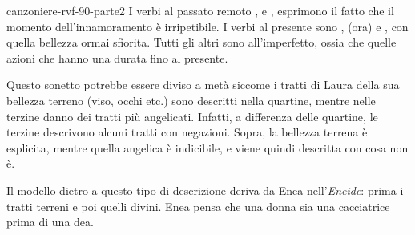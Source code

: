 \documentclass[preview]{standalone}
\begin{document}
\begin{snippet}{canzoniere-rvf-90-parte2}
    I verbi al passato remoto ,  e ,
    esprimono il fatto che il momento dell'innamoramento è irripetibile.
    I verbi al presente sono ,  (ora) e ,
    con quella bellezza ormai sfiorita.
    Tutti gli altri sono all'imperfetto, ossia che quelle azioni che hanno una durata fino al presente.

    Questo sonetto potrebbe essere diviso a metà siccome i tratti di Laura
    della sua bellezza terreno (viso, occhi etc.) sono descritti nella quartine,
    mentre nelle terzine danno dei tratti più angelicati.
    Infatti, a differenza delle quartine, le terzine descrivono alcuni tratti con
    negazioni. Sopra, la bellezza terrena è esplicita, mentre quella angelica è indicibile,
    e viene quindi descritta con cosa non è.

    Il modello dietro a questo tipo di descrizione deriva da Enea nell'\textit{Eneide}:
    prima i tratti terreni e poi quelli divini. Enea pensa che una donna sia una cacciatrice
    prima di una dea.


\end{snippet}
\end{document}
